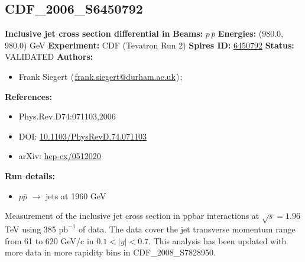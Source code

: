 \subsection[CDF\_2006\_S6450792]{CDF\_2006\_S6450792\,\cite{Abulencia:2005yg}}
\textbf{Inclusive jet cross section differential in \pT}\newline
\textbf{Beams:} $p$\,$\bar{p}$ \newline
\textbf{Energies:} (980.0, 980.0) GeV \newline
\textbf{Experiment:} CDF (Tevatron Run 2) \newline
\textbf{Spires ID:} \href{http://www.slac.stanford.edu/spires/find/hep/www?rawcmd=key+6450792}{6450792}\newline
\textbf{Status:} VALIDATED\newline
\textbf{Authors:}
\begin{itemize}
  \item Frank Siegert $\langle\,$\href{mailto:frank.siegert@durham.ac.uk}{frank.siegert@durham.ac.uk}$\,\rangle$;
\end{itemize}
\textbf{References:}
\begin{itemize}
  \item Phys.Rev.D74:071103,2006
  \item DOI: \href{http://dx.doi.org/10.1103/PhysRevD.74.071103}{10.1103/PhysRevD.74.071103}
  \item arXiv: \href{http://arxiv.org/abs/hep-ex/0512020}{hep-ex/0512020}
\end{itemize}
\textbf{Run details:}
\begin{itemize}

  \item $p\bar{p}$ \ensuremath{\to} jets at 1960 GeV\end{itemize}

\noindent Measurement of the inclusive jet cross section in ppbar interactions at $\sqrt{s}=1.96$ TeV using 385 $\mathrm{pb}^{-1}$ of data. The data cover the jet transverse momentum range from 61 to 620 GeV/c in $0.1 < |y| < 0.7$. This analysis has been updated with more data in more rapidity bins in CDF_2008_S7828950.

\clearpage


\clearpage

